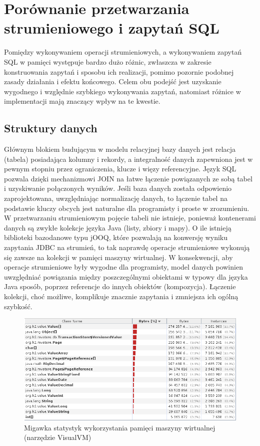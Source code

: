 \documentclass[12pt,twoside,openright]{extarticle}
\begin{document}
\section{Porównanie przetwarzania strumieniowego i zapytań SQL}

    Pomiędzy wykonywaniem operacji strumieniowych, a wykonywaniem zapytań SQL w pamięci występuje bardzo dużo różnic, zwłaszcza w zakresie konstruowania zapytań i sposobu ich realizacji, pomimo pozornie podobnej zasady działania i efektu końcowego. Celem obu podejść jest uzyskanie wygodnego i względnie szybkiego wykonywania zapytań, natomiast różnice w implementacji mają znaczący wpływ na te kwestie.

\subsection{Struktury danych}

    Głównym blokiem budującym w modelu relacyjnej bazy danych jest relacja (tabela) posiadająca kolumny i rekordy, a integralność danych zapewniona jest w pewnym stopniu przez ograniczenia, klucze i więzy referencyjne. Język SQL pozwala dzięki mechanizmowi JOIN na łatwe łączenie powiązanych ze sobą tabel i uzyskiwanie połączonych wyników. Jeśli baza danych została odpowienio zaprojektowana, uwzględniając normalizację danych, to łączenie tabel na podstawie kluczy obcych jest naturalne dla programisty i proste w zrozumieniu. W przetwarzaniu strumieniowym pojęcie tabeli nie istnieje, ponieważ kontenerami danych są zwykłe kolekcje języka Java (listy, zbiory i mapy). O ile istnieją biblioteki bazodanowe typu jOOQ, które pozwalają na konwersję wyniku zapytania JDBC na strumień, to tak naprawdę operacje strumieniowe wykonują się zawsze na kolekcji w pamięci maszyny wirtualnej. W konsekwencji, aby operacje strumieniowe były wygodne dla programisty, model danych powinien uwzględniać powiązania między poszczególnymi obiektami w typowy dla języka Java sposób, poprzez referencje do innych obiektów (kompozycja). Łączenie kolekcji, choć możliwe, komplikuje znacznie zapytania i zmniejsza ich ogólną szybkość.

\begin{figure}[h]
\centering
\includegraphics[width=15cm]{jvmmemory}
\caption{Migawka statystyk wykorzystania pamięci maszyny wirtualnej (narzędzie VisualVM)}
\label{fig:jvmmemory}
\end{figure}
\end{document}
